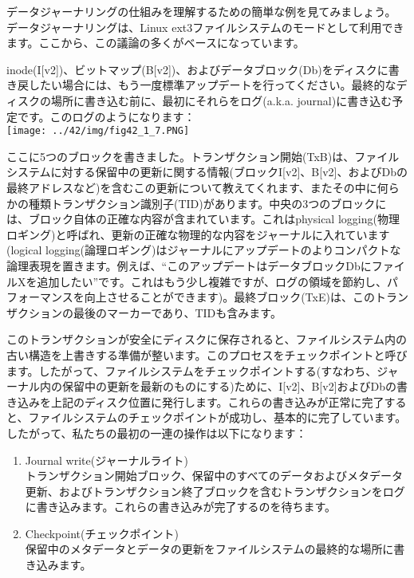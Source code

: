 データジャーナリングの仕組みを理解するための簡単な例を見てみましょう。
データジャーナリングは、Linux
ext3ファイルシステムのモードとして利用できます。ここから、この議論の多くがベースになっています。

inode(I{[}v2{]})、ビットマップ(B{[}v2{]})、およびデータブロック(Db)をディスクに書き戻したい場合には、もう一度標準アップデートを行ってください。最終的なディスクの場所に書き込む前に、最初にそれらをログ(a.k.a.
journal)に書き込む予定です。このログのようになります：\\
\texttt{[image: ../42/img/fig42\_1\_7.PNG]}

ここに5つのブロックを書きました。トランザクション開始(TxB)は、ファイルシステムに対する保留中の更新に関する情報(ブロックI{[}v2{]}、B{[}v2{]}、およびDbの最終アドレスなど)を含むこの更新について教えてくれます、またその中に何らかの種類トランザクション識別子(TID)があります。中央の3つのブロックには、ブロック自体の正確な内容が含まれています。これはphysical
logging(物理ロギング)と呼ばれ、更新の正確な物理的な内容をジャーナルに入れています(logical
logging(論理ロギング)はジャーナルにアップデートのよりコンパクトな論理表現を置きます。例えば、``このアップデートはデータブロックDbにファイルXを追加したい''です。これはもう少し複雑ですが、ログの領域を節約し、パフォーマンスを向上させることができます)。最終ブロック(TxE)は、このトランザクションの最後のマーカーであり、TIDも含みます。

このトランザクションが安全にディスクに保存されると、ファイルシステム内の古い構造を上書きする準備が整います。このプロセスをチェックポイントと呼びます。したがって、ファイルシステムをチェックポイントする(すなわち、ジャーナル内の保留中の更新を最新のものにする)ために、I{[}v2{]}、B{[}v2{]}およびDbの書き込みを上記のディスク位置に発行します。これらの書き込みが正常に完了すると、ファイルシステムのチェックポイントが成功し、基本的に完了しています。したがって、私たちの最初の一連の操作は以下になります：

\begin{enumerate}
\def\labelenumi{\arabic{enumi}.}
\tightlist
\item
  Journal write(ジャーナルライト)\\
  トランザクション開始ブロック、保留中のすべてのデータおよびメタデータ更新、およびトランザクション終了ブロックを含むトランザクションをログに書き込みます。これらの書き込みが完了するのを待ちます。\\
\item
  Checkpoint(チェックポイント)\\
  保留中のメタデータとデータの更新をファイルシステムの最終的な場所に書き込みます。
\end{enumerate}

